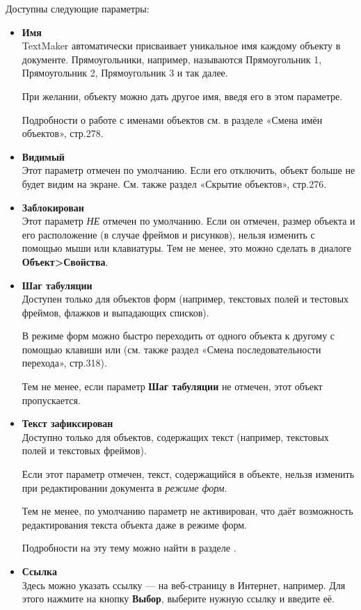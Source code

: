 ﻿\documentclass[a4paper,10pt]{article}
\begin{document}
Доступны следующие параметры:
\begin{itemize}
 \item \textbf{Имя}\\
TextMaker автоматически присваивает уникальное имя каждому объекту в документе. Прямоугольники, например, называются Прямоугольник 1,  Прямоугольник 2, Прямоугольник 3 и так далее.

При желании, объекту можно дать другое имя, введя его в этом параметре.

Подробности о работе с именами объектов см. в разделе «Смена имён объектов», стр.278.
\item \textbf{Видимый}\\
Этот параметр отмечен по умолчанию. Если его отключить, объект больше не будет видим на экране. См. также раздел «Скрытие объектов», стр.276.
\item \textbf{Заблокирован}\\
Этот параметр \textit{НЕ} отмечен по умолчанию. Если он отмечен, размер объекта и его расположение (в случае фреймов и рисунков), нельзя изменить с помощью мыши или клавиатуры. Тем не менее, это можно сделать в диалоге \textbf{Объект>Свойства}.
\item \textbf{Шаг табуляции}\\
Доступен только для объектов форм (например, текстовых полей и тестовых фреймов, флажков и выпадающих списков).

В режиме форм можно быстро переходить от одного объекта к другому с помощью клавиши  или  (см. также раздел «Смена последовательности перехода», стр.318).

Тем не менее, если параметр \textbf{Шаг табуляции} не отмечен, этот объект пропускается.

\item \textbf{Текст зафиксирован}\\
Доступно только для объектов, содержащих текст (например, текстовых полей и текстовых фреймов).

Если этот параметр отмечен, текст, содержащийся в объекте, нельзя изменить при редактировании документа в \textit{режиме форм}.

Тем не менее, по умолчанию параметр не активирован, что даёт возможность редактирования текста объекта даже в режиме форм.

Подробности на эту тему можно найти в разделе .
\item \textbf{Ссылка}\\
Здесь можно указать ссылку — на веб-страницу в Интернет, например. Для этого нажмите на кнопку \textbf{Выбор}, выберите нужную ссылку и введите её.
\end{itemize}
\end{document}
